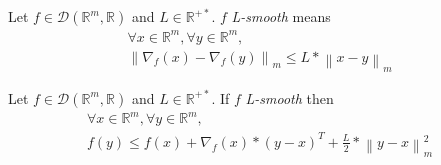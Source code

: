 \documentclass[11pt,en]{elegantpaper}
\newcommand{\norm}[1]{\left\lVert#1\right\rVert}
\newcommand{\Real}{\mathbb{R}}
\begin{document}
\begin{definition}
  Let $f \in \mathcal{D}(\Real^m,\Real)$ and $L \in \Real^{+*}$. $f$ \textit{L-smooth} means \begin{equation}\label{def:lsmooth_eq}
    \begin{gathered}
      \forall x \in \Real^m, \forall y \in \Real^m, \\
      \norm{\nabla_f(x) - \nabla_f(y)}_m \leq L * \norm{x - y}_m 
    \end{gathered}
  \end{equation}
\end{definition}

\begin{proposition}
  {\normalfont
    Let $f \in \mathcal{D}(\Real^m,\Real)$ and $L \in \Real^{+*}$. If $f$ \textit{L-smooth} then \begin{equation}\label{prop:lsmooth_implies}
      \begin{gathered}
        \forall x \in \Real^m, \forall y \in \Real^m, \\
        f(y) \leq f(x) + \nabla_f(x) * (y - x)^T + \frac{L}{2} * \norm{y - x}_m^2
      \end{gathered}
    \end{equation}
  }
\end{proposition}
\end{document}
